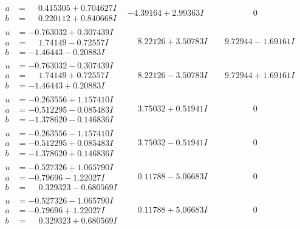 \documentclass[1p]{elsarticle_modified}
\theoremstyle{definition}
\begin{document}
$$\begin{array}{c|c|c}
\begin{aligned}
a &= \phantom{-}0.415305 + 0.704627 I \\
b &= \phantom{-}0.220112 + 0.840668 I\end{aligned}
 & -4.39164 + 2.99363 I & \phantom{-0.000000 } 0 \\ \hline\begin{aligned}
u &= -0.763032 + 0.307439 I \\
a &= \phantom{-}1.74149 - 0.72557 I \\
b &= -1.46443 - 0.20883 I\end{aligned}
 & \phantom{-}8.22126 + 3.50783 I & \phantom{-}9.72944 - 1.69161 I \\ \hline\begin{aligned}
u &= -0.763032 - 0.307439 I \\
a &= \phantom{-}1.74149 + 0.72557 I \\
b &= -1.46443 + 0.20883 I\end{aligned}
 & \phantom{-}8.22126 - 3.50783 I & \phantom{-}9.72944 + 1.69161 I \\ \hline\begin{aligned}
u &= -0.263556 + 1.157410 I \\
a &= -0.512295 - 0.085483 I \\
b &= -1.378620 - 0.146836 I\end{aligned}
 & \phantom{-}3.75032 + 0.51941 I & \phantom{-0.000000 } 0 \\ \hline\begin{aligned}
u &= -0.263556 - 1.157410 I \\
a &= -0.512295 + 0.085483 I \\
b &= -1.378620 + 0.146836 I\end{aligned}
 & \phantom{-}3.75032 - 0.51941 I & \phantom{-0.000000 } 0 \\ \hline\begin{aligned}
u &= -0.527326 + 1.065790 I \\
a &= -0.79696 - 1.22027 I \\
b &= \phantom{-}0.329323 - 0.680569 I\end{aligned}
 & \phantom{-}0.11788 - 5.06683 I & \phantom{-0.000000 } 0 \\ \hline\begin{aligned}
u &= -0.527326 - 1.065790 I \\
a &= -0.79696 + 1.22027 I \\
b &= \phantom{-}0.329323 + 0.680569 I\end{aligned}
 & \phantom{-}0.11788 + 5.06683 I & \phantom{-0.000000 } 0 \\ \hline\begin{aligned}

\end{aligned}
\end{array}$$
\end{document}

